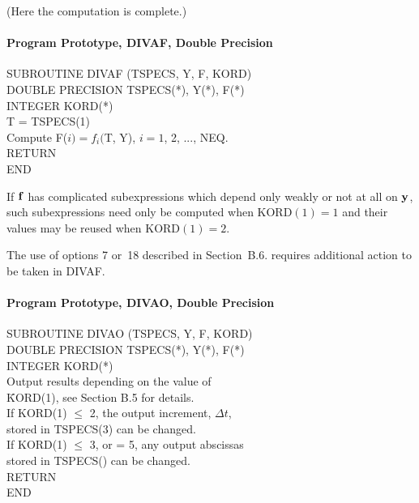 \documentclass[twoside]{MATH77}
\begin{document}

(Here the computation is complete.)

\paragraph{Program Prototype, DIVAF, Double Precision\label{DIVAF}}

{\tt \begin{tabbing}
  SUBROUTINE DIVAF (TSPECS, Y, F, KORD)\\
  DOUBLE PRECISION TSPECS(*), Y(*), F(*)\\
  INTEGER KORD(*)\\
  T = TSPECS(1)\\
  Compute F($i) = f_i($T, Y), $i = 1$, 2, ..., NEQ.\\
  RETURN\\
  END
\end{tabbing}}
\vspace{-5pt}
If ${\bf f}$ has complicated subexpressions which depend only weakly or not
at all on ${\bf y}$, such subexpressions need only be computed when KORD$%
(1)=1$ and their values may be reused when KORD$(1)=2.$

The use of options 7 or~18 described in Section~B.6. requires additional
action to be taken in DIVAF.

\paragraph{Program Prototype, DIVAO, Double Precision\label{DIVAO}}
{\tt \begin{tabbing}
 SUBROUTINE DIVAO (TSPECS, Y, F, KORD)\\
 DOUBLE PRECISION TSPECS(*), Y(*), F(*)\\
 INTEGER KORD(*)\\
 Output results depending on the value of\\
 \quad \=KORD(1), see Section B.5 for details.\\
 If KORD(1) $\leq$ 2, the output increment, $\Delta t$,\\
 \>stored in TSPECS(3) can be changed.\\
 If KORD(1) $\leq$ 3, or = 5, any output abscissas\\
 \>stored in TSPECS() can be changed.\\
 RETURN\\
 END
\end{tabbing}}\vspace{-10pt}
\end{document}
